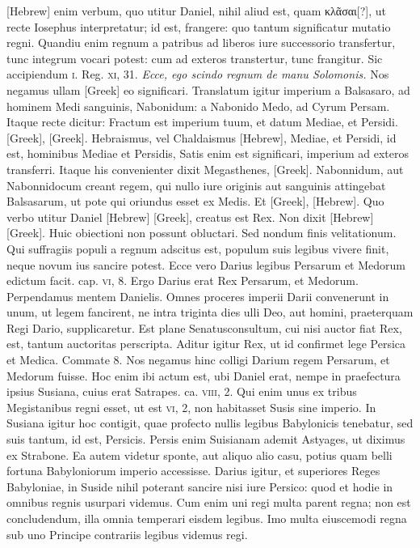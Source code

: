 \texthebrew{[Hebrew]} enim verbum, quo utitur Daniel,
 nihil aliud est, quam
\textgreek{κλᾶσαι[?]}, ut recte Iosephus interpretatur;
 id est, frangere: quo tantum
significatur mutatio regni.
Quandiu enim regnum a patribus
ad liberos iure successorio transfertur, tunc integrum vocari potest:
cum ad exteros transtertur, tunc frangitur.
Sic accipiendum \textsc{i}.
Reg. \textsc{xi}, 31.
\textit{Ecce, ego scindo regnum  de manu Solomonis.}
Nos negamus ullam \textgreek{[Greek]} eo significari.
Translatum igitur imperium
a Balsasaro, ad hominem Medi sanguinis, Nabonidum: a Nabonido
Medo, ad Cyrum Persam.
Itaque recte dicitur: Fractum est
imperium tuum, et datum Mediae, et Persidi.
\textgreek{[Greek]},
\textgreek{[Greek]}.
Hebraismus, vel Chaldaismus
\texthebrew{[Hebrew]}, Mediae, et Persidi, id est, hominibus Mediae et Persidis,
Satis enim est significari, imperium ad exteros transferri.
Itaque his convenienter
dixit Megasthenes, \textgreek{[Greek]}.
Nabonnidum, aut Nabonnidocum creant regem, qui
nullo iure originis aut sanguinis attingebat Balsasarum, ut pote qui
oriundus esset ex Medis.
Et \textgreek{[Greek]}, \texthebrew{[Hebrew]}.
Quo verbo utitur
Daniel \texthebrew{[Hebrew]} \textgreek{[Greek]}, creatus est Rex.
Non dixit \texthebrew{[Hebrew]} \textgreek{[Greek]}.
Huic obiectioni non possunt obluctari.
Sed nondum
finis velitationum.
Qui suffragiis populi a regnum adscitus est,
populum suis legibus vivere finit, neque novum ius sancire potest.
Ecce vero Darius legibus Persarum et Medorum edictum facit.
cap. \textsc{vi}, 8.
Ergo Darius erat Rex Persarum, et Medorum.
Perpendamus
mentem Danielis.
Omnes proceres imperii Darii convenerunt
in unum, ut legem fancirent, ne intra triginta dies ulli
Deo, aut homini, praeterquam Regi Dario, supplicaretur.
Est plane
Senatusconsultum, cui nisi auctor fiat Rex, est, tantum auctoritas
perscripta.
Aditur igitur Rex, ut id confirmet lege Persica et
Medica.
Commate 8.
Nos negamus hinc colligi Darium regem
Persarum, et Medorum fuisse.
Hoc enim ibi actum est, ubi Daniel
erat, nempe in praefectura ipsius Susiana, cuius erat Satrapes.
ca. \textsc{viii}, 2.
Qui enim unus ex tribus Megistanibus regni esset, ut est
\textsc{vi}, 2, non habitasset Susis sine imperio.
In Susiana igitur hoc contigit,
quae profecto nullis legibus Babylonicis tenebatur, sed suis
tantum, id est, Persicis.
Persis enim Suisianam ademit Astyages, ut
diximus ex Strabone.
Ea autem videtur sponte, aut aliquo alio casu,
potius quam belli fortuna Babyloniorum imperio accessisse.
Darius igitur, et superiores Reges Babyloniae, in Suside nihil poterant
sancire nisi iure Persico: quod et hodie in omnibus regnis usurpari
videmus.
Cum enim uni regi multa parent regna; non est concludendum,
illa omnia temperari eisdem legibus.
Imo multa eiuscemodi regna sub uno Principe contrariis
 legibus videmus regi.

